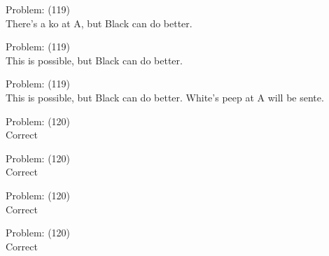 \documentclass[11pt]{article}
\begin{document}
\begin{minipage}[t]{0.5\textwidth}
  {\centering
  
Problem: (119)\\
There's a ko at A, but Black can do better.\\
  }
\end{minipage}
\begin{minipage}[t]{0.5\textwidth}
  {\centering
  
Problem: (119)\\
This is possible, but Black can do better.\\
  }
\end{minipage}
\begin{minipage}[t]{0.5\textwidth}
  {\centering
  
Problem: (119)\\
This is possible, but Black can do better. White's peep at A will be sente.\\
  }
\end{minipage}
\begin{minipage}[t]{0.5\textwidth}
  {\centering
  
Problem: (120)\\
Correct\\
  }
\end{minipage}
\begin{minipage}[t]{0.5\textwidth}
  {\centering
  
Problem: (120)\\
Correct\\
  }
\end{minipage}
\begin{minipage}[t]{0.5\textwidth}
  {\centering
  
Problem: (120)\\
Correct\\
  }
\end{minipage}
\begin{minipage}[t]{0.5\textwidth}
  {\centering
  
Problem: (120)\\
Correct\\
  }
\end{minipage}
\end{document}
